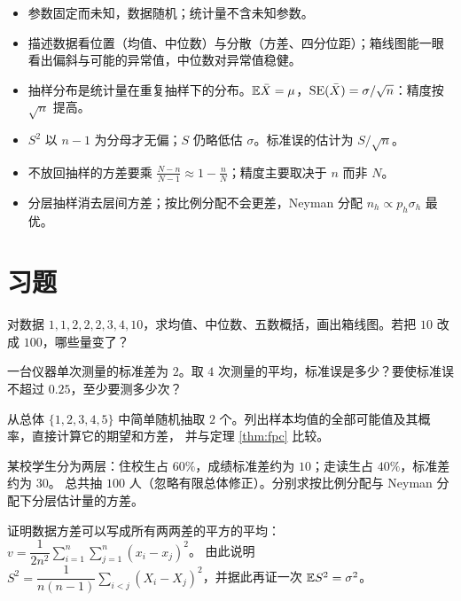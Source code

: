\begin{summary}
\begin{itemize}
\item 参数固定而未知，数据随机；统计量不含未知参数。
\item 描述数据看位置（均值、中位数）与分散（方差、四分位距）；箱线图能一眼看出偏斜与可能的异常值，中位数对异常值稳健。
\item 抽样分布是统计量在重复抽样下的分布。$\mathbb{E}\bar{X}=\mu$，$\operatorname{SE}(\bar{X})=\sigma/\sqrt n$：精度按 $\sqrt n$ 提高。
\item $S^2$ 以 $n-1$ 为分母才无偏；$S$ 仍略低估 $\sigma$。标准误的估计为 $S/\sqrt n$。
\item 不放回抽样的方差要乘 $\frac{N-n}{N-1}\approx1-\frac nN$；精度主要取决于 $n$ 而非 $N$。
\item 分层抽样消去层间方差；按比例分配不会更差，Neyman 分配 $n_h\propto p_h\sigma_h$ 最优。
\end{itemize}
\end{summary}

\section*{习题}

\levelA
\begin{exercise}
对数据 $1,1,2,2,2,3,4,10$，求均值、中位数、五数概括，画出箱线图。若把 $10$ 改成 $100$，哪些量变了？
\end{exercise}

\begin{exercise}
一台仪器单次测量的标准差为 $2$。取 $4$ 次测量的平均，标准误是多少？要使标准误不超过 $0.25$，至少要测多少次？
\end{exercise}

\begin{exercise}
从总体 $\{1,2,3,4,5\}$ 中简单随机抽取 $2$ 个。列出样本均值的全部可能值及其概率，直接计算它的期望和方差，
并与定理 \ref{thm:fpc} 比较。
\end{exercise}

\begin{exercise}
某校学生分为两层：住校生占 $60\%$，成绩标准差约为 $10$；走读生占 $40\%$，标准差约为 $30$。
总共抽 $100$ 人（忽略有限总体修正）。分别求按比例分配与 Neyman 分配下分层估计量的方差。
\end{exercise}

\levelB
\begin{exercise}\label{ex1:pairdiff}
证明数据方差可以写成所有两两差的平方的平均：$v=\dfrac{1}{2n^2}\displaystyle\sum_{i=1}^n\sum_{j=1}^n(x_i-x_j)^2$。
由此说明 $S^2=\dfrac{1}{n(n-1)}\displaystyle\sum_{i<j}(X_i-X_j)^2$，并据此再证一次 $\mathbb{E} S^2=\sigma^2$。
\end{exercise}

